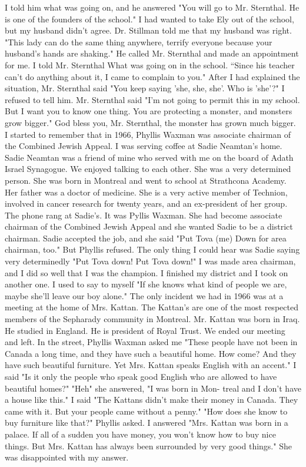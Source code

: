 I told him what was 
going on, and he answered "You will go to Mr.
Sternthal.
He is one of 
the founders of the school."
I had wanted to take Ely out of the school, 
but my husband didn't agree.
Dr.
Stillman told me that my husband was 
right.
"This lady can do the same thing anywhere, terrify everyone because your husband's hands are shaking."
He called Mr.
Sternthal and made an appointment for me.
I told Mr.
Sternthal What was going on in the school.
“Since his teacher can't do anything about it, I came to complain to you."
After I had explained the situation, Mr.
Sternthal said 
"You keep saying 'she, she, she'.
Who is 'she'?"
I refused to tell him.
Mr.
Sternthal said "I'm not going to permit this in my school.
But I want 
you to know one thing.
You are protecting a monster, and monsters grow 
bigger."
God bless you, Mr.
Sternthal, the monster has grown much bigger.
I started to remember that in 1966, Phyllis Waxman was associate chairman of the Combined Jewish Appeal.
I was serving coffee at Sadie Neamtan's 
home.
Sadie Neamtan was a friend of mine who served with me on the board 
of Adath Israel Synagogue.
We enjoyed talking to each other.
She was a 
very determined person.
She was born in Montreal and went to school at 
Strathcona Academy.
Her father was a doctor of medicine.
She is a very 
active member of Technion, involved in cancer research for twenty years, and 
an ex-president of her group.
The phone rang at Sadie's.
It was Pyllis Waxman.
She had become
associate chairman of the Combined Jewish Appeal and she wanted 
Sadie to be a district chairman.
Sadie accepted the job, and she said "Put Tova (me) 
Down for area chairman, too."
But Phyllis refused.
The only thing I could hear was Sadie saying very determinedly "Put Tova down!
Put Tova down!"
I was made area chairman, and I did so well that I was the champion.
I finished my district and I took on another one.
I used to say 
to myself "If she knows what kind of people we are, maybe she'll leave our boy alone."
The only incident we had in 1966 was at a meeting at the home of Mrs.
Kattan.
The Kattan's are one of the most respected members of the Sepharady community in Montreal.
Mr.
Kattan was born in Iraq.
He studied in England.
He is president of Royal Trust.
We ended our meeting and left.
In the street, Phyllis Waxman asked me "These people have not been in Canada a long time, and they have such a beautiful home.
How come?
And 
they have such beautiful furniture.
Yet Mrs.
Kattan speaks English with 
an accent."
I said "Is it only the people who speak good English who are 
allowed to have beautiful homes?"
"Heh" she answered, "I was born in Mon-
treal and I don't have a house like this."
I said "The Kattans didn't make 
their money in Canada.
They came with it.
But your people came 
without a penny."
"How does she know to buy furniture like that?"
Phyllis 
asked.
I answered "Mrs.
Kattan was born in a palace.
If all of a sudden 
you have money, you won't know how to buy nice things.
But Mrs.
Kattan 
has always been surrounded by very good things."
She was disappointed 
with my answer.